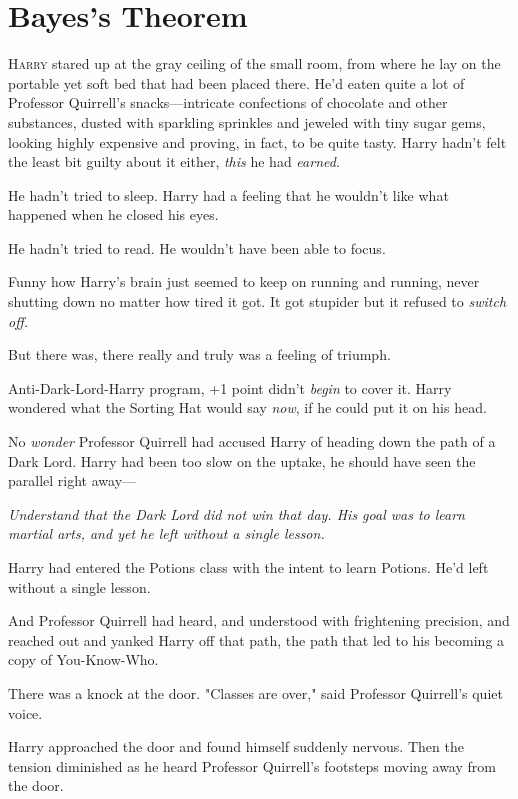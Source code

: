 \chapter{Bayes's Theorem}

\lettrine{H}{arry} stared up at the gray ceiling of the small room, from where he lay on the 
portable yet soft bed that had been placed there. He'd eaten quite a lot of 
Professor Quirrell's snacks---intricate confections of chocolate and other 
substances, dusted with sparkling sprinkles and jeweled with tiny sugar gems, 
looking highly expensive and proving, in fact, to be quite tasty. Harry hadn't 
felt the least bit guilty about it either, \emph{this} he had \emph{earned}.

He hadn't tried to sleep. Harry had a feeling that he wouldn't like what 
happened when he closed his eyes.

He hadn't tried to read. He wouldn't have been able to focus.

Funny how Harry's brain just seemed to keep on running and running, never 
shutting down no matter how tired it got. It got stupider but it refused to 
\emph{switch off.}

But there was, there really and truly was a feeling of triumph.

Anti-Dark-Lord-Harry program, +1 point didn't \emph{begin} to cover it. Harry 
wondered what the Sorting Hat would say \emph{now}, if he could put it on his 
head.

No \emph{wonder} Professor Quirrell had accused Harry of heading down the path 
of a Dark Lord. Harry had been too slow on the uptake, he should have seen the 
parallel right away---

\emph{Understand that the Dark Lord did not win that day. His goal was to learn 
martial arts, and yet he left without a single lesson.}

Harry had entered the Potions class with the intent to learn Potions. He'd left 
without a single lesson.

And Professor Quirrell had heard, and understood with frightening precision, 
and reached out and yanked Harry off that path, the path that led to his 
becoming a copy of You-Know-Who.

There was a knock at the door. "Classes are over," said Professor Quirrell's 
quiet voice.

Harry approached the door and found himself suddenly nervous. Then the tension 
diminished as he heard Professor Quirrell's footsteps moving away from the door.

